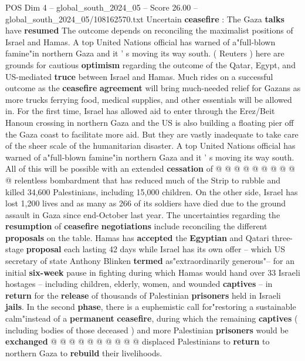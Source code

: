 \begin{textsample}{POS Dim 4 – global\_south\_2024\_05 – Score 26.00 – global\_south\_2024\_05/108162570.txt}  \label{ex:f4_pos_203}
Uncertain \textbf{ceasefire} : The Gaza \textbf{talks} have \textbf{resumed} The outcome depends on reconciling the maximalist positions of Israel and Hamas.
A top United Nations official has warned of a"full-blown famine"in northern Gaza and it ' s moving its way south. ( Reuters ) here are grounds for cautious \textbf{optimism} regarding the outcome of the Qatar, Egypt, and US-mediated \textbf{truce} between Israel and Hamas.
Much rides on a successful outcome as the \textbf{ceasefire} \textbf{agreement} will bring much-needed relief for Gazans as more trucks ferrying food, medical supplies, and other essentials will be allowed in.
For the first time, Israel has allowed aid to enter through the Erez/Beit Hanoun crossing in northern Gaza and the US is also building a floating pier off the Gaza coast to facilitate more aid.
But they are vastly inadequate to take care of the sheer scale of the humanitarian disaster.
A top United Nations official has warned of a"full-blown famine"in northern Gaza and it ' s moving its way south.
All of this will be possible with an extended \textbf{cessation} of @ @ @ @ @ @ @ @ @ @ relentless bombardment that has reduced much of the Strip to rubble and killed 34,600 Palestinians, including 15,000 children.
On the other side, Israel has lost 1,200 lives and as many as 266 of its soldiers have died due to the ground assault in Gaza since end-October last year.
The uncertainties regarding the \textbf{resumption} of \textbf{ceasefire} \textbf{negotiations} include reconciling the different \textbf{proposals} on the table.
Hamas has \textbf{accepted} the \textbf{Egyptian} and Qatari three-stage \textbf{proposal} each lasting 42 days while Israel has its own offer -- which US secretary of state Anthony Blinken \textbf{termed} as"extraordinarily generous"-- for an initial \textbf{six-week} pause in fighting during which Hamas would hand over 33 Israeli hostages -- including children, elderly, women, and wounded \textbf{captives} -- in \textbf{return} for the \textbf{release} of thousands of Palestinian \textbf{prisoners} held in Israeli \textbf{jails}.
In the second \textbf{phase}, there is a euphemistic call for"restoring a sustainable calm"instead of a \textbf{permanent} \textbf{ceasefire}, during which the remaining \textbf{captives} ( including bodies of those deceased ) and more Palestinian \textbf{prisoners} would be \textbf{exchanged} @ @ @ @ @ @ @ @ @ @ displaced Palestinians to \textbf{return} to northern Gaza to \textbf{rebuild} their livelihoods.

\end{textsample}
